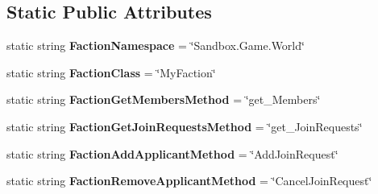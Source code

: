 \subsection*{Static Public Attributes}
\begin{DoxyCompactItemize}
\item 
\hypertarget{class_s_e_mod_a_p_i_internal_1_1_a_p_i_1_1_common_1_1_faction_ae01ccc4a6df98aadeffe1e59fd565755}{}static string {\bfseries Faction\+Namespace} = \char`\"{}Sandbox.\+Game.\+World\char`\"{}\label{class_s_e_mod_a_p_i_internal_1_1_a_p_i_1_1_common_1_1_faction_ae01ccc4a6df98aadeffe1e59fd565755}

\item 
\hypertarget{class_s_e_mod_a_p_i_internal_1_1_a_p_i_1_1_common_1_1_faction_a6173f1e9fe2020f5db68dc54dfff4e6b}{}static string {\bfseries Faction\+Class} = \char`\"{}My\+Faction\char`\"{}\label{class_s_e_mod_a_p_i_internal_1_1_a_p_i_1_1_common_1_1_faction_a6173f1e9fe2020f5db68dc54dfff4e6b}

\item 
\hypertarget{class_s_e_mod_a_p_i_internal_1_1_a_p_i_1_1_common_1_1_faction_a7359522a1f2aa7e1a443a2c16709e7b6}{}static string {\bfseries Faction\+Get\+Members\+Method} = \char`\"{}get\+\_\+\+Members\char`\"{}\label{class_s_e_mod_a_p_i_internal_1_1_a_p_i_1_1_common_1_1_faction_a7359522a1f2aa7e1a443a2c16709e7b6}

\item 
\hypertarget{class_s_e_mod_a_p_i_internal_1_1_a_p_i_1_1_common_1_1_faction_a66d930b8d39438e84854de5c321b2134}{}static string {\bfseries Faction\+Get\+Join\+Requests\+Method} = \char`\"{}get\+\_\+\+Join\+Requests\char`\"{}\label{class_s_e_mod_a_p_i_internal_1_1_a_p_i_1_1_common_1_1_faction_a66d930b8d39438e84854de5c321b2134}

\item 
\hypertarget{class_s_e_mod_a_p_i_internal_1_1_a_p_i_1_1_common_1_1_faction_a8f5c23307b06d2d0784895e012db35ef}{}static string {\bfseries Faction\+Add\+Applicant\+Method} = \char`\"{}Add\+Join\+Request\char`\"{}\label{class_s_e_mod_a_p_i_internal_1_1_a_p_i_1_1_common_1_1_faction_a8f5c23307b06d2d0784895e012db35ef}

\item 
\hypertarget{class_s_e_mod_a_p_i_internal_1_1_a_p_i_1_1_common_1_1_faction_a97aa838cea2a002a1de44375bdbf5057}{}static string {\bfseries Faction\+Remove\+Applicant\+Method} = \char`\"{}Cancel\+Join\+Request\char`\"{}\label{class_s_e_mod_a_p_i_internal_1_1_a_p_i_1_1_common_1_1_faction_a97aa838cea2a002a1de44375bdbf5057}


\end{DoxyCompactItemize}

